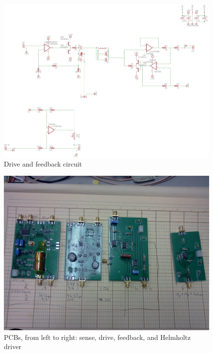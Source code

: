 \documentclass[journal,12pt,onecolumn,draftclsnofoot]{IEEEtran}
\begin{document}
\begin{figure}[h!]
\centering
\includegraphics[width=5in]{finalplots/drive_feedback}
\caption{Drive and feedback circuit}
\label{fig:drive_feedback}
\end{figure}


\begin{figure}[h!]
\centering
\includegraphics[width=5in]{finalplots/pcbs}
\caption{PCBs, from left to right: sense, drive, feedback, and Helmholtz driver}
\label{fig:pcbs}
\end{figure}
\end{document}
